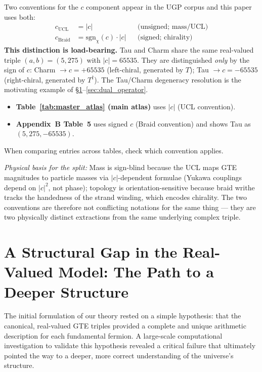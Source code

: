 \documentclass[11pt]{article}
\theoremstyle{remark}
\begin{document}
\begin{tcolorbox}[colback=blue!5!white, colframe=blue!60!black,
                  title={\textbf{Load-bearing convention: $c$-sign and chirality}},
                  fonttitle=\bfseries, boxrule=0.8pt]
Two conventions for the $c$ component appear in the UGP corpus and this paper uses both:
\begin{align*}
  c_{\mathrm{UCL}} &= |c| && \text{(unsigned; mass/UCL)} \\
  c_{\mathrm{Braid}} &= \mathrm{sgn}_\chi(c)\cdot|c| && \text{(signed; chirality)}
\end{align*}
\textbf{This distinction is load-bearing.}
Tau and Charm share the same real-valued triple $(a,b) = (5, 275)$ with $|c| = 65535$. They are distinguished \emph{only} by the sign of $c$:
Charm $\to c = +65535$ (left-chiral, generated by $T$);
Tau $\to c = -65535$ (right-chiral, generated by $T^\dagger$).
The Tau/Charm degeneracy resolution is the motivating example of \S\ref{sec:crisis}--\ref{sec:dual_operator}.
\begin{itemize}[nosep]
  \item \textbf{Table~\ref{tab:master_atlas} (main atlas)} uses $|c|$ (UCL convention).
  \item \textbf{Appendix~B Table~5} uses signed $c$ (Braid convention) and shows Tau as $(5,275,-65535)$.
\end{itemize}
When comparing entries across tables, check which convention applies.

\smallskip\noindent\textit{Physical basis for the split:} Mass is sign-blind because the UCL maps GTE magnitudes to particle masses via $|c|$-dependent formulae (Yukawa couplings depend on $|c|^2$, not phase); topology is orientation-sensitive because braid writhe tracks the handedness of the strand winding, which encodes chirality. The two conventions are therefore not conflicting notations for the same thing — they are two physically distinct extractions from the same underlying complex triple.
\end{tcolorbox}

\section{A Structural Gap in the Real-Valued Model: The Path to a Deeper Structure}
\label{sec:crisis}

The initial formulation of our theory rested on a simple hypothesis: that the canonical, real-valued GTE triples provided a complete and unique arithmetic description for each fundamental fermion. A large-scale computational investigation to validate this hypothesis revealed a critical failure that ultimately pointed the way to a deeper, more correct understanding of the universe's structure.
\end{document}
